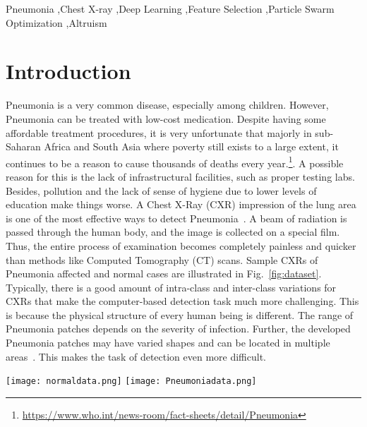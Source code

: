 \documentclass[final,3p,times]{elsarticle}
\begin{document}
\begin{frontmatter}
\begin{keyword}
Pneumonia \sep Chest X-ray \sep Deep Learning \sep Feature Selection \sep Particle Swarm Optimization \sep Altruism
\end{keyword}

\end{frontmatter}

\section{Introduction}
\label{sec:introduction}
Pneumonia is {a} very common {disease,} especially among children. {However,} Pneumonia can be treated with {low-cost} medication. Despite having some affordable treatment procedures, it is very unfortunate that majorly in sub-Saharan Africa and South Asia where poverty still exists to a large extent, it continues to be a reason to cause thousands of deaths every year.\footnote{\href{https://www.who.int/news-room/fact-sheets/detail/Pneumonia}{https://www.who.int/news-room/fact-sheets/detail/Pneumonia}}. A possible reason for this is the lack of infrastructural {facilities,} such as proper testing labs. Besides, pollution and the lack of sense of hygiene due to lower levels of education make things worse. A Chest X-Ray (CXR) impression of the lung area is one of the most effective ways to detect Pneumonia~\cite{makhnevich2019clinical}. A beam of radiation is passed through the human body, and the image is collected on a special film. {Thus,} the entire process of examination becomes completely painless and quicker than methods like Computed Tomography (CT) scans. Sample CXRs of Pneumonia {affected} and normal cases are {illustrated} in Fig.~\ref{fig:dataset}. {Typically,} there is a good amount of intra-class and inter-class variations for CXRs {that make} the computer-based detection task much more challenging. This is {because} the physical structure of every human being is different. The range of Pneumonia patches depends on the severity of infection. Further, the developed Pneumonia patches may have varied {shapes} and can be located in multiple areas~\cite{ho2015usefulness}. This makes the task of detection even more difficult.\\
\begin{figure*}
    \centering
    \texttt{[image: normaldata.png]}
    \texttt{[image: Pneumoniadata.png]}
    \caption{CXRs of Pneumonia and normal cases. Images are taken from the Kermany et al.~\cite{kermany2018identifying} dataset. The top row consists of images belonging to the normal category, whereas images in the bottom row belong to confirmed Pneumonia cases.}
    \label{fig:dataset}
\end{figure*}
\end{document}
